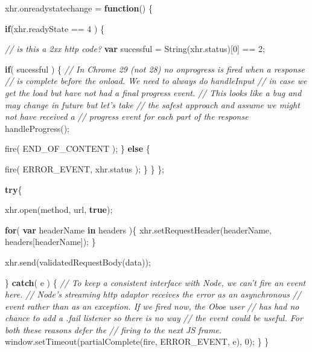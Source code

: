 \documentclass[]{article}
\newenvironment{Shaded}{}{}
\newcommand{\KeywordTok}[1]{\textcolor[rgb]{0.00,0.44,0.13}{\textbf{{#1}}}}
\newcommand{\DecValTok}[1]{\textcolor[rgb]{0.25,0.63,0.44}{{#1}}}
\newcommand{\CommentTok}[1]{\textcolor[rgb]{0.38,0.63,0.69}{\textit{{#1}}}}
\newcommand{\OtherTok}[1]{\textcolor[rgb]{0.00,0.44,0.13}{{#1}}}
\newcommand{\FunctionTok}[1]{\textcolor[rgb]{0.02,0.16,0.49}{{#1}}}
\newcommand{\NormalTok}[1]{{#1}}
\begin{document}
\begin{Shaded}
\begin{Highlighting}[]
   \OtherTok{xhr}\NormalTok{.}\FunctionTok{onreadystatechange} \NormalTok{= }\KeywordTok{function}\NormalTok{() \{}
            
      \KeywordTok{if}\NormalTok{(}\OtherTok{xhr}\NormalTok{.}\FunctionTok{readyState} \NormalTok{== }\DecValTok{4} \NormalTok{) \{}

         \CommentTok{// is this a 2xx http code?}
         \KeywordTok{var} \NormalTok{sucessful = }\FunctionTok{String}\NormalTok{(}\OtherTok{xhr}\NormalTok{.}\FunctionTok{status}\NormalTok{)[}\DecValTok{0}\NormalTok{] == }\DecValTok{2}\NormalTok{;}
         
         \KeywordTok{if}\NormalTok{( sucessful ) \{}
            \CommentTok{// In Chrome 29 (not 28) no onprogress is fired when a response}
            \CommentTok{// is complete before the onload. We need to always do handleInput}
            \CommentTok{// in case we get the load but have not had a final progress event.}
            \CommentTok{// This looks like a bug and may change in future but let's take}
            \CommentTok{// the safest approach and assume we might not have received a }
            \CommentTok{// progress event for each part of the response}
            \FunctionTok{handleProgress}\NormalTok{();}
            
            \FunctionTok{fire}\NormalTok{( END_OF_CONTENT );}
         \NormalTok{\} }\KeywordTok{else} \NormalTok{\{}
         
            \FunctionTok{fire}\NormalTok{( ERROR_EVENT, }\OtherTok{xhr}\NormalTok{.}\FunctionTok{status} \NormalTok{);}
         \NormalTok{\}}
      \NormalTok{\}}
   \NormalTok{\};}

   \KeywordTok{try}\NormalTok{\{}
   
      \OtherTok{xhr}\NormalTok{.}\FunctionTok{open}\NormalTok{(method, url, }\KeywordTok{true}\NormalTok{);}
   
      \KeywordTok{for}\NormalTok{( }\KeywordTok{var} \NormalTok{headerName }\KeywordTok{in} \NormalTok{headers )\{}
         \OtherTok{xhr}\NormalTok{.}\FunctionTok{setRequestHeader}\NormalTok{(headerName, headers[headerName]);}
      \NormalTok{\}}
      
      \OtherTok{xhr}\NormalTok{.}\FunctionTok{send}\NormalTok{(}\FunctionTok{validatedRequestBody}\NormalTok{(data));}
      
   \NormalTok{\} }\KeywordTok{catch}\NormalTok{( e ) \{}
      \CommentTok{// To keep a consistent interface with Node, we can't fire an event here.}
      \CommentTok{// Node's streaming http adaptor receives the error as an asynchronous}
      \CommentTok{// event rather than as an exception. If we fired now, the Oboe user}
      \CommentTok{// has had no chance to add a .fail listener so there is no way}
      \CommentTok{// the event could be useful. For both these reasons defer the}
      \CommentTok{// firing to the next JS frame.  }
      \OtherTok{window}\NormalTok{.}\FunctionTok{setTimeout}\NormalTok{(}\FunctionTok{partialComplete}\NormalTok{(fire, ERROR_EVENT, e), }\DecValTok{0}\NormalTok{);}
   \NormalTok{\}            }
\NormalTok{\}}
\end{Highlighting}
\end{Shaded}
\end{document}
